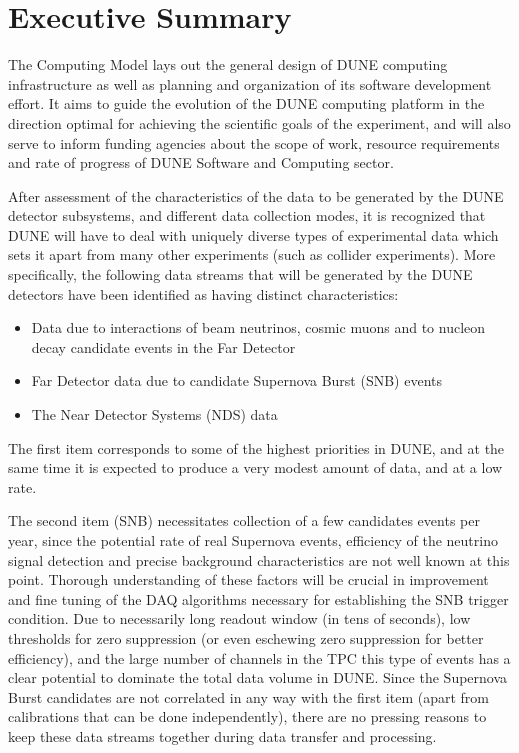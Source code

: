 \section{Executive Summary}
The Computing Model lays out the general design of DUNE computing infrastructure as well as planning and
organization of its software development effort. It aims to guide the evolution of the DUNE computing
platform in the direction optimal for achieving the scientific goals of the experiment, and will also serve
to inform funding agencies about the scope of work, resource requirements and rate of progress of 
DUNE Software and Computing sector.

After assessment of the characteristics of the data to be generated by the DUNE detector subsystems,
and different data collection modes, it is recognized that DUNE will have to deal with uniquely diverse
types of experimental data which sets it apart from many other experiments (such as collider experiments). More specifically,
the following data streams that will be generated by the DUNE detectors have been identified as having distinct characteristics:
\begin{itemize}

\item Data due to interactions of beam neutrinos, cosmic muons and to nucleon decay candidate events in the Far Detector

\item Far Detector data due to candidate Supernova Burst (SNB) events

\item The Near Detector Systems (NDS) data

\end{itemize}

\noindent
The first item corresponds to some of the highest priorities in DUNE, and at the same time it is expected to produce
a very modest amount of data, and at a low rate.

The second item (SNB) necessitates collection of a few candidates
events per year, since the potential rate of real Supernova events, efficiency of the neutrino signal detection
and precise background characteristics are not well known at this point. Thorough understanding of these factors will be crucial
in improvement and fine tuning of the DAQ algorithms necessary for establishing the SNB trigger condition.
Due to necessarily long readout window (in tens of seconds), low thresholds for zero suppression (or even
eschewing zero suppression for better efficiency), and the large number of channels in the TPC this type of events
has a clear potential to dominate the total data volume in DUNE. Since the Supernova Burst candidates are not correlated
in any way with the first item (apart from calibrations that can be done independently), there are no pressing reasons to keep
these data streams together during data transfer and processing.

